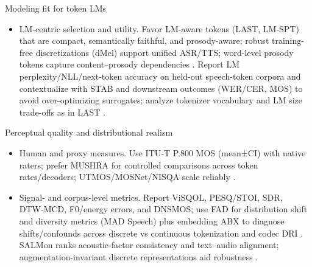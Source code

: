 \documentclass{article}
\begin{document}
Modeling fit for token LMs
\begin{itemize}
  \item LM-centric selection and utility. Favor LM-aware tokens (LAST, LM‑SPT) that are compact, semantically faithful, and prosody-aware; robust training-free discretizations (dMel) support unified ASR/TTS; word-level prosody tokens capture content–prosody dependencies \cite{turetzky2024lastlanguagemodelawarespeechtokenization,jo2025lmsptalignedsemanticdistillationspeechto,bai2025dmelspeechtokenizationmadesimple,qian2025prosodylmuncoveringemergingprosodyproces}. Report LM perplexity/NLL/next-token accuracy on held-out speech-token corpora and contextualize with STAB and downstream outcomes (WER/CER, MOS) to avoid over-optimizing surrogates; analyze tokenizer vocabulary and LM size trade-offs as in LAST \cite{vashishth2024stabspeechtokenizerassessmentbenchmark,turetzky2024lastlanguagemodelawarespeechtokenization}.
\end{itemize}

Perceptual quality and distributional realism
\begin{itemize}
  \item Human and proxy measures. Use ITU‑T P.800 MOS (mean±CI) with native raters; prefer MUSHRA for controlled comparisons across token rates/decoders; UTMOS/MOSNet/NISQA scale reliably \cite{nakata2024jchatjapaneselargescalespokendialoguecor,yang2025diffsoundstreamefficientspeechtokenizati}.
  \item Signal- and corpus-level metrics. Report ViSQOL, PESQ/STOI, SDR, DTW‑MCD, F0/energy errors, and DNSMOS; use FAD for distribution shift and diversity metrics (MAD Speech) plus embedding ABX to diagnose shifts/confounds across discrete vs continuous tokenization and codec DRI \cite{fily2024establishingdegreesclosenessbetweenaudio,futeral2025madspeechmeasuresacousticdiversity,li2025continuousspeechtokenizertext,liu2024analyzingmitigatinginconsistencydiscrete}. SALMon ranks acoustic-factor consistency and text–audio alignment; augmentation-invariant discrete representations aid robustness \cite{maimon2025salmonsuiteacousticlanguagemodelevaluati,entry2025augmentationinvariantdiscreterepresentat}.
\end{itemize}
\end{document}
